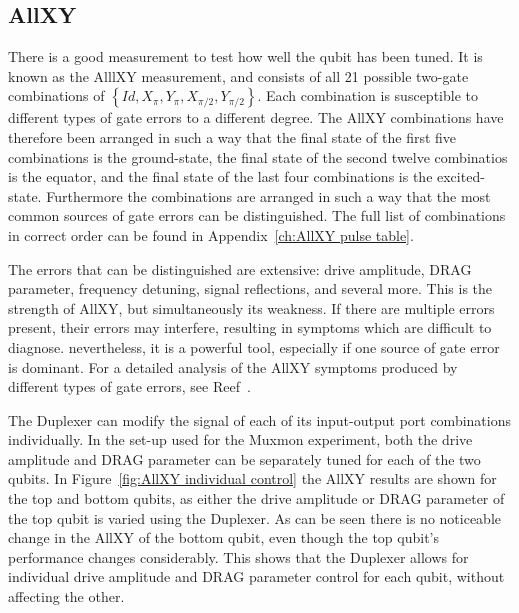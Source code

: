       \subsection{AllXY}
        \label{ssec:AllXY}
        There is a good measurement to test how well the qubit has been tuned. It is known as the AlllXY measurement, and consists of all 21 possible two-gate combinations of $\left\{Id, X_{\pi}, Y_{\pi}, X_{\pi/2}, Y_{\pi/2}\right\}$. Each combination is susceptible to different types of gate errors to a different degree. The AllXY combinations have therefore been arranged in such a way that the final state of the first five combinations is the ground-state, the final state of the second twelve combinatios is the equator, and the final state of the last four combinations is the excited-state. Furthermore the combinations are arranged in such a way that the most common sources of gate errors can be distinguished. The full list of combinations in correct order can be found in Appendix~\ref{ch:AllXY pulse table}.

        The errors that can be distinguished are extensive: drive amplitude, DRAG parameter, frequency detuning, signal reflections, and several more. This is the strength of AllXY, but simultaneously its weakness. If there are multiple errors present, their errors may interfere, resulting in symptoms which are difficult to diagnose. nevertheless, it is a powerful tool, especially if one source of gate error is dominant. For a detailed analysis of the AllXY symptoms produced by different types of gate errors, see Reef~\cite{Reed}.

        The Duplexer can modify the signal of each of its input-output port combinations individually. In the set-up used for the Muxmon experiment, both the drive amplitude and DRAG parameter can be separately tuned for each of the two qubits. In Figure~\ref{fig:AllXY individual control} the AllXY results are shown for the top and bottom qubits, as either the drive amplitude or DRAG parameter of the top qubit is varied using the Duplexer. As can be seen there is no noticeable change in the AllXY of the bottom qubit, even though the top qubit's performance changes considerably. This shows that the Duplexer allows for individual drive amplitude and DRAG parameter control for each qubit, without affecting the other.

